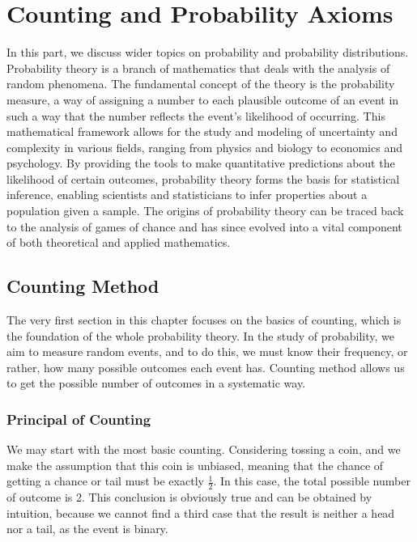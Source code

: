 \chapterspaceabove{6.75cm} 
\chapterspacebelow{7.25cm} 



\chapter{Counting and Probability Axioms}
In this part, we discuss wider topics on probability and probability distributions. 
Probability theory is a branch of mathematics that deals with the analysis of random phenomena. The fundamental concept of the theory is the probability measure, a way of assigning a number to each plausible outcome of an event in such a way that the number reflects the event's likelihood of occurring. This mathematical framework allows for the study and modeling of uncertainty and complexity in various fields, ranging from physics and biology to economics and psychology. By providing the tools to make quantitative predictions about the likelihood of certain outcomes, probability theory forms the basis for statistical inference, enabling scientists and statisticians to infer properties about a population given a sample. The origins of probability theory can be traced back to the analysis of games of chance and has since evolved into a vital component of both theoretical and applied mathematics.

    \section{Counting Method}
    The very first section in this chapter focuses on the basics of counting, which is the foundation of the whole probability theory. In the study of probability, we aim to measure 
    random events, and to do this, we must know their frequency, or rather, how many possible outcomes each event has. Counting method allows us to get the possible number of outcomes in a 
    systematic way.

    \subsection{Principal of Counting}
    We may start with the most basic counting. Considering tossing a coin, and we make the assumption that this coin is unbiased, meaning that the chance of getting a chance or tail must be 
    exactly $\frac{1}{2}$. In this case, the total possible number of outcome is 2. This conclusion is obviously true and can be obtained by intuition, because we cannot find a third case that the result is neither a head nor a tail, as the event
    is binary.

